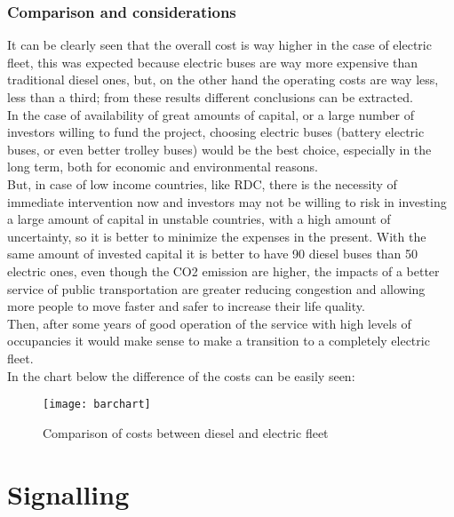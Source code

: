 \documentclass{article}
\begin{document}
\subsubsection{Comparison and considerations}
It can be clearly seen that the overall cost is way higher in the case of electric fleet, this was expected because electric buses are way more expensive than traditional diesel ones, but, on the other hand the operating costs are way less, less than a third; from these results different conclusions can be extracted.\\
In the case of availability of great amounts of capital, or a large number of investors willing to fund the project, choosing electric buses (battery electric buses, or even better trolley buses) would be the best choice, especially in the long term, both for economic and environmental reasons.\\
But, in case of low income countries, like RDC, there is the necessity of immediate intervention now and investors may not be willing to risk in investing a large amount of capital in unstable countries, with a high amount of uncertainty, so it is better to minimize the expenses in the present. With the same amount of invested capital it is better to have 90 diesel buses than 50 electric ones, even though the CO2 emission are higher, the impacts of a better service of public transportation are greater  reducing congestion and allowing more people to move faster and safer to increase their life quality.\\
Then, after some years of good operation of the service with high levels of occupancies it would make sense to make a transition to a completely electric fleet.\\
In the chart below the difference of the costs can be easily seen:
\begin{figure}[H]
\centering
\texttt{[image: barchart]}
\caption{Comparison of costs between diesel and electric fleet}
\end{figure}
\newpage
\section{Signalling} %
\end{document}
